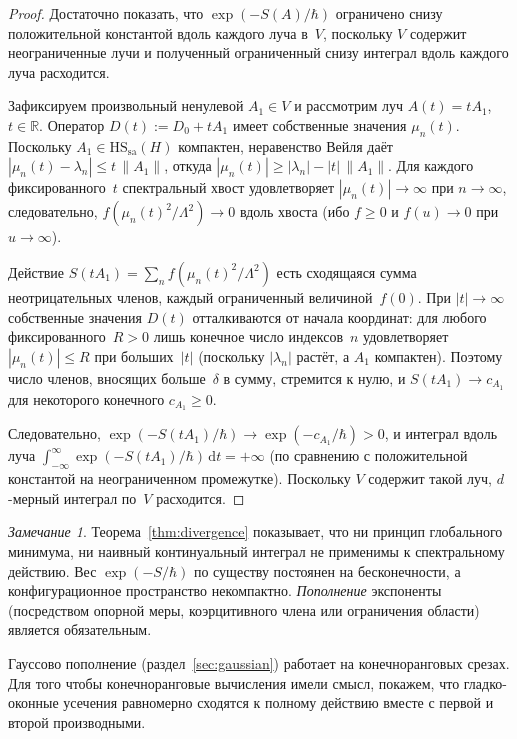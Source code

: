\documentclass[12pt,a4paper]{article}
\theoremstyle{plain}
\theoremstyle{definition}
\theoremstyle{remark}
\newtheorem{remark}[theorem]{Замечание}
\newcommand{\dd}{\mathrm{d}}
\newcommand{\HS}{\mathrm{HS}}
\newcommand{\sa}{\mathrm{sa}}
\newcommand{\R}{\mathbb{R}}
\newcommand{\Lam}{\Lambda}
\begin{document}
\begin{proof}
Достаточно показать, что $\exp(-S(A)/\hbar)$ ограничено снизу
положительной константой вдоль каждого луча в~$V$, поскольку $V$
содержит неограниченные лучи и полученный ограниченный снизу интеграл
вдоль каждого луча расходится.

Зафиксируем произвольный ненулевой $A_1 \in V$ и рассмотрим луч
$A(t) = tA_1$, $t \in \R$.  Оператор $D(t) := D_0 + tA_1$ имеет
собственные значения $\mu_n(t)$.  Поскольку $A_1 \in \HS_\sa(H)$
компактен, неравенство Вейля даёт
$|\mu_n(t) - \lambda_n| \le t\,\|A_1\|$, откуда
$|\mu_n(t)| \ge |\lambda_n| - |t|\,\|A_1\|$.  Для каждого
фиксированного~$t$ спектральный хвост удовлетворяет
$|\mu_n(t)| \to \infty$ при $n \to \infty$, следовательно,
$f(\mu_n(t)^2/\Lam^2) \to 0$ вдоль хвоста
(ибо $f \ge 0$ и $f(u) \to 0$ при $u \to \infty$).

Действие $S(tA_1) = \sum_n f(\mu_n(t)^2/\Lam^2)$ есть сходящаяся
сумма неотрицательных членов, каждый ограниченный величиной~$f(0)$.
При $|t| \to \infty$ собственные значения $D(t)$ отталкиваются от
начала координат: для любого фиксированного~$R > 0$ лишь конечное число
индексов~$n$ удовлетворяет $|\mu_n(t)| \le R$ при больших~$|t|$
(поскольку $|\lambda_n|$ растёт, а $A_1$ компактен).  Поэтому число
членов, вносящих больше~$\delta$ в сумму, стремится к нулю, и
$S(tA_1) \to c_{A_1}$ для некоторого конечного $c_{A_1} \ge 0$.

Следовательно, $\exp(-S(tA_1)/\hbar) \to \exp(-c_{A_1}/\hbar) > 0$,
и интеграл вдоль луча
$\int_{-\infty}^\infty \exp(-S(tA_1)/\hbar)\,\dd t = +\infty$
(по сравнению с положительной константой на неограниченном
промежутке).  Поскольку $V$ содержит такой луч, $d$-мерный интеграл
по~$V$ расходится.
\end{proof}

\begin{remark}
Теорема~\ref{thm:divergence} показывает, что ни принцип глобального
минимума, ни наивный континуальный интеграл не применимы к
спектральному действию.  Вес $\exp(-S/\hbar)$ по существу постоянен
на бесконечности, а конфигурационное пространство некомпактно.
\emph{Пополнение} экспоненты (посредством опорной меры,
коэрцитивного члена или ограничения области) является
обязательным.
\end{remark}

Гауссово пополнение (раздел~\ref{sec:gaussian}) работает на конечноранговых срезах. Для того чтобы конечноранговые вычисления имели смысл, покажем, что гладко-оконные усечения равномерно сходятся к полному действию вместе с первой и второй производными.
\end{document}
